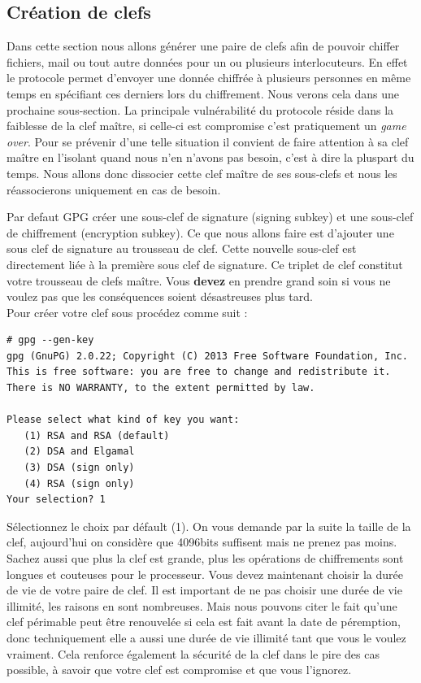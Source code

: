 \documentclass[a4paper]{article}
\begin{document}
\subsection{Création de clefs}

Dans cette section nous allons générer une paire de clefs afin de pouvoir
chiffer fichiers, mail ou tout autre données pour un ou plusieurs
interlocuteurs. En effet le protocole permet d'envoyer une donnée chiffrée à
plusieurs personnes en même temps en spécifiant ces derniers lors du
chiffrement. Nous verons cela dans une prochaine sous-section.
La principale vulnérabilité du protocole réside dans la faiblesse de la clef
maître, si celle-ci est compromise c'est pratiquement un \emph{game over}.
Pour se prévenir d'une telle situation il convient de faire attention à sa clef
maître en l'isolant quand nous n'en n'avons pas besoin, c'est à dire la pluspart
du temps. Nous allons donc dissocier cette clef maître de ses sous-clefs et
nous les réassocierons uniquement en cas de besoin.

Par defaut \textsc{GPG} créer une sous-clef de signature (signing subkey) et
une sous-clef de chiffrement (encryption subkey). Ce que nous allons faire est
d'ajouter une sous clef de signature au trousseau de clef. Cette nouvelle
sous-clef est directement liée à la première sous clef de signature. Ce triplet
de clef constitut votre trousseau de clefs maître. Vous \textbf{devez} en prendre grand
soin si vous ne voulez pas que les conséquences soient désastreuses plus tard.
\\
Pour créer votre clef sous procédez comme suit :
\begin{verbatim}
# gpg --gen-key
gpg (GnuPG) 2.0.22; Copyright (C) 2013 Free Software Foundation, Inc.
This is free software: you are free to change and redistribute it.
There is NO WARRANTY, to the extent permitted by law.

Please select what kind of key you want:
   (1) RSA and RSA (default)
   (2) DSA and Elgamal
   (3) DSA (sign only)
   (4) RSA (sign only)
Your selection? 1
\end{verbatim}

Sélectionnez le choix par défault (1). On vous demande par la suite la taille
de la clef, aujourd'hui on considère que 4096bits suffisent mais ne prenez pas
moins. Sachez aussi que plus la clef est grande, plus les opérations de
chiffrements sont longues et couteuses pour le processeur.
Vous devez maintenant choisir la durée de vie de votre paire de clef. Il est
important de ne pas choisir une durée de vie illimité, les raisons en sont
nombreuses. Mais nous pouvons citer le fait qu'une clef périmable peut être
renouvelée si cela est fait avant la date de péremption, donc techniquement elle
a aussi une durée de vie illimité tant que vous le voulez vraiment.
Cela renforce également la sécurité de la clef dans le pire des cas possible,
à savoir que votre clef est compromise et que vous l'ignorez.
\end{document}
